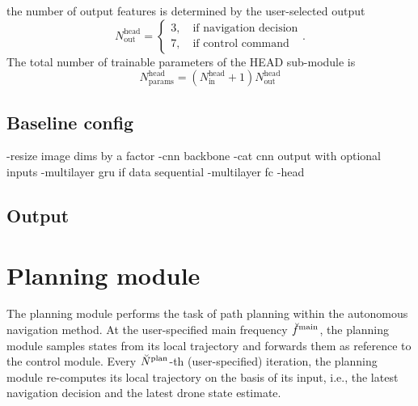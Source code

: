 the number of output features is determined by 
the user-selected output
\begin{equation}
    N^\text{head}_\text{out}
    = 
    \begin{cases}
        3
        ,\quad 
        \text{if navigation decision} 
        \\
        7
        ,\quad 
        \text{if control command} 
    \end{cases}.
\end{equation}
The total number of trainable parameters of the HEAD sub-module is
\begin{equation}
    N^\text{head}_\text{params} 
    = 
    \left(
        N^\text{head}_\text{in} + 1
    \right)
    N^\text{head}_\text{out}
\end{equation}


\subsection{Baseline config}



%


-resize image dims by a factor
-cnn backbone
-cat cnn output with optional inputs
-multilayer gru if data sequential
-multilayer fc
-head




\subsection*{Output}










\section{Planning module}
The planning module performs the task of path planning
within the autonomous navigation method.
At the user-specified main frequency 
$\freq[\user]{\main}{}{}{}$,
the planning module 
samples states from its local trajectory
and forwards them as reference to the control module.
Every $\num[\user]{\text{plan}}{}{}{}$-th (user-specified) iteration,
the planning module re-computes its local trajectory
on the basis of its input,
i.e., the latest navigation decision and the latest drone state estimate. 

